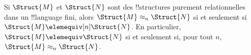 \documentclass[../../../include/open-logic-section]{subfiles}
\begin{document}
\begin{cor}
  Si $\Struct{M}$ et $\Struct{N}$ sont des !!{structure}s
  purement relationnelles dans un !!{language} fini, alors
  $\Struct{M} \approx_n\Struct{N}$ si et seulement si
  $\Struct{M} \elemequiv[n] \Struct{N}$. En particulier,
  $\Struct{M} \elemequiv \Struct{N}$ si et seulement si,
  pour tout $n$, $\Struct{M} \approx_n \Struct{N}$.
\end{cor}
\end{document}
